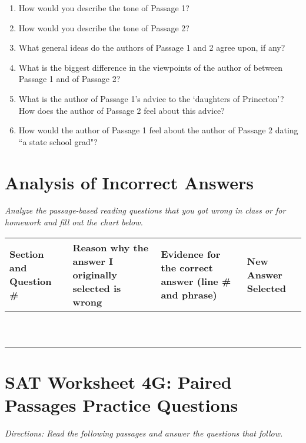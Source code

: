 \begin{enumerate}
\item How would you describe the tone of Passage 1? 
\vfill\item How would you describe the tone of Passage 2?  
\vfill\item What general ideas do the authors of Passage 1 and 2 agree upon, if any?
\vfill\item What is the biggest difference in the viewpoints of the author of between Passage 1 and of Passage 2?
\vfill\item What is the author of Passage 1's advice to the `daughters of Princeton'?  How does the author of Passage 2 feel about this advice?
\vfill\item How would the author of Passage 1 feel about the author of Passage 2 dating ``a state school grad"? 
\end{enumerate}

\vfill
\newpage
\section[Analyzing Incorrect]{Analysis of Incorrect Answers}
\textit{Analyze the passage-based reading questions that you got wrong in class or for homework and fill out the chart below.}

\bigskip
\begin{tabularx}{\textwidth}{|X|p{2in}|p{2in}|X|}\hline
Section and Question \# & Reason why the answer I originally selected is wrong & Evidence for the correct answer (line \# and phrase) & New Answer Selected\\\hline
& & &\\[8ex]\hline
& & &\\[8ex]\hline
& & &\\[8ex]\hline
& & &\\[8ex]\hline
& & &\\[8ex]\hline
& & &\\[8ex]\hline
& & &\\[8ex]\hline
& & &\\[8ex]\hline
& & &\\[8ex]\hline
& & &\\[8ex]\hline
\end{tabularx}

\section[Paired Passages]{SAT Worksheet 4G: Paired Passages Practice Questions}
\textit{Directions: Read the following passages and answer the questions that follow.}

